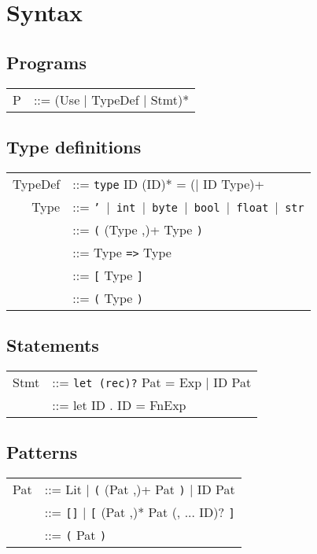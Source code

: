 \documentclass[a4paper]{article}
\newcommand{\Star}[1]{{\color{red}(}#1{\color{red})*}}
\newcommand{\Plus}[1]{{\color{red}(}#1{\color{red})+}}
\newcommand{\Or}{{\color{red}$|$}}
\newcommand{\Maybe}[1]{{\color{red}(}#1{\color{red})?}}
\begin{document}
\section{Syntax}

\subsection{Programs}

\begin{tabular}{rl}
    P &::= \Star{Use \Or{} TypeDef \Or{} Stmt}
\end{tabular}

\subsection{Type definitions}
\begin{tabular}{rl}
    TypeDef &::= \texttt{type} ID \Star{ID} = \Plus{$|$ ID Type}\\
    Type &::= \texttt{' \Or{} int \Or{} byte \Or{} bool \Or{} float \Or{} str}\\
    &::= \texttt{(} \Plus{Type ,} Type \texttt{)}\\
    &::= Type \texttt{=>} Type\\
    &::= \texttt{[} Type \texttt{]}\\
    &::= \texttt{(} Type \texttt{)}
\end{tabular}

\subsection{Statements}
\begin{tabular}{rl}
    Stmt &::= \texttt{let \Maybe{rec}} Pat = Exp \Or{} ID Pat\\
    &::= let ID . ID = FnExp
\end{tabular}

\subsection{Patterns}
\begin{tabular}{rl}
    Pat &::= Lit \Or{} \texttt{(} \Plus{Pat ,} Pat \texttt{)} \Or{} ID Pat\\
    &::= \texttt{[]} \Or{} \texttt{[} \Star{Pat ,} Pat  \Maybe{, ... ID} \texttt{]}\\
    &::= \texttt{(} Pat \texttt{)}
\end{tabular}
\end{document}

